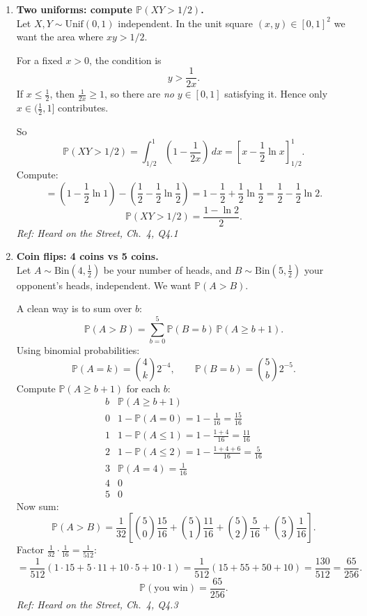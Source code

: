 \documentclass[11pt]{article}
\begin{document}
\begin{enumerate}[label=\textbf{\arabic*.}]

\item \textbf{Two uniforms: compute $\mathbb{P}(XY>1/2)$.}\\
Let $X,Y\sim \text{Unif}(0,1)$ independent. In the unit square $(x,y)\in[0,1]^2$ we want the area where $xy>1/2$.

For a fixed $x>0$, the condition is
\[
y>\frac{1}{2x}.
\]
If $x\le \tfrac12$, then $\tfrac{1}{2x}\ge 1$, so there are \emph{no} $y\in[0,1]$ satisfying it. Hence only $x\in(\tfrac12,1]$ contributes.

So
\[
\mathbb{P}(XY>1/2)=\int_{1/2}^1 \left(1-\frac{1}{2x}\right)\,dx
= \left[x-\frac12\ln x\right]_{1/2}^1.
\]
Compute:
\[
= \left(1-\frac12\ln 1\right) - \left(\frac12-\frac12\ln\frac12\right)
= 1-\frac12 + \frac12\ln\frac12
= \frac12-\frac12\ln 2.
\]
\[
\boxed{\mathbb{P}(XY>1/2)=\frac{1-\ln 2}{2}.}
\]
\hfill{\small\textit{Ref: Heard on the Street, Ch.\ 4, Q4.1}}

\item \textbf{Coin flips: 4 coins vs 5 coins.}\\
Let $A\sim\text{Bin}(4,\tfrac12)$ be your number of heads, and $B\sim\text{Bin}(5,\tfrac12)$ your opponent’s heads, independent.
We want $\mathbb{P}(A>B)$.

A clean way is to sum over $b$:
\[
\mathbb{P}(A>B)=\sum_{b=0}^{5}\mathbb{P}(B=b)\,\mathbb{P}(A\ge b+1).
\]
Using binomial probabilities:
\[
\mathbb{P}(A=k)=\binom{4}{k}2^{-4},\qquad \mathbb{P}(B=b)=\binom{5}{b}2^{-5}.
\]
Compute $\mathbb{P}(A\ge b+1)$ for each $b$:
\[
\begin{array}{c|c}
b & \mathbb{P}(A\ge b+1)\\ \hline
0 & 1-\mathbb{P}(A=0)=1-\frac{1}{16}=\frac{15}{16}\\
1 & 1-\mathbb{P}(A\le 1)=1-\frac{1+4}{16}=\frac{11}{16}\\
2 & 1-\mathbb{P}(A\le 2)=1-\frac{1+4+6}{16}=\frac{5}{16}\\
3 & \mathbb{P}(A=4)=\frac{1}{16}\\
4 & 0\\
5 & 0
\end{array}
\]
Now sum:
\[
\mathbb{P}(A>B)=\frac{1}{32}\left[
\binom50\frac{15}{16}+\binom51\frac{11}{16}+\binom52\frac{5}{16}+\binom53\frac{1}{16}
\right].
\]
Factor $\frac{1}{32}\cdot\frac{1}{16}=\frac{1}{512}$:
\[
=\frac{1}{512}\left(1\cdot 15 + 5\cdot 11 + 10\cdot 5 + 10\cdot 1\right)
=\frac{1}{512}(15+55+50+10)=\frac{130}{512}=\frac{65}{256}.
\]
\[
\boxed{\mathbb{P}(\text{you win})=\frac{65}{256}.}
\]
\hfill{\small\textit{Ref: Heard on the Street, Ch.\ 4, Q4.3}}


\end{enumerate}
\end{document}

